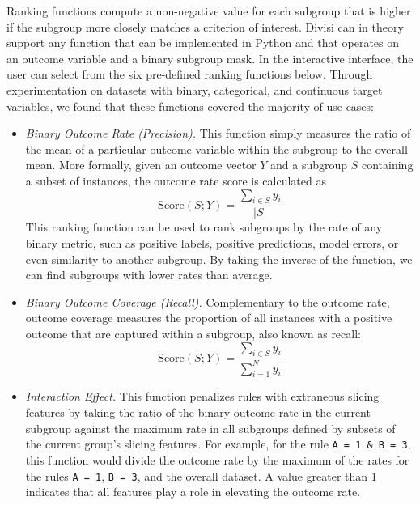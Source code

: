 Ranking functions compute a non-negative value for each subgroup that is higher if the subgroup more closely matches a criterion of interest. Divisi can in theory support any function that can be implemented in Python and that operates on an outcome variable and a binary subgroup mask.
In the interactive interface, the user can select from the six pre-defined ranking functions below. Through experimentation on datasets with binary, categorical, and continuous target variables, we found that these functions covered the majority of use cases:
\begin{itemize}[leftmargin=*]
    \item \textit{Binary Outcome Rate (Precision).} This function simply measures the ratio of the mean of a particular outcome variable within the subgroup to the overall mean. More formally, given an outcome vector $Y$ and a subgroup $S$ containing a subset of instances, the outcome rate score is calculated as
    \begin{equation}
    \text{Score}(S; Y) = \frac{\sum_{i \in S} y_i}{|S|}
    \end{equation}
    This ranking function can be used to rank subgroups by the rate of any binary metric, such as positive labels, positive predictions, model errors, or even similarity to another subgroup. By taking the inverse of the function, we can find subgroups with lower rates than average.

    \item \textit{Binary Outcome Coverage (Recall).} Complementary to the outcome rate, outcome coverage measures the proportion of all instances with a positive outcome that are captured within a subgroup, also known as recall:
    \begin{equation}
        \text{Score}(S; Y) = \frac{\sum_{i \in S} y_i}{\sum_{i = 1}^{N} y_i}
    \end{equation}

    \item \textit{Interaction Effect.} This function penalizes rules with extraneous slicing features by taking the ratio of the binary outcome rate in the current subgroup against the maximum rate in all subgroups defined by subsets of the current group's slicing features. For example, for the rule \texttt{A = 1 \& B = 3}, this function would divide the outcome rate by the maximum of the rates for the rules \texttt{A = 1}, \texttt{B = 3}, and the overall dataset. A value greater than 1 indicates that all features play a role in elevating the outcome rate.
    

\end{itemize}
